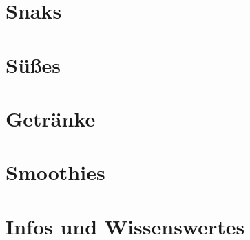 \documentclass[a4paper]{scrartcl}
\begin{document}
\section{Snaks} %
%

\section{Süßes} %



\section{Getränke} %


\section{Smoothies} %


\section{Infos und Wissenswertes} %
%
	

\end{document}
